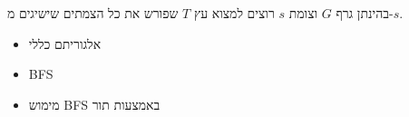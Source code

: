 בהינתן גרף $G$ וצומת $s$ רוצים למצוא עץ $T$ שפורש את כל הצמתים שישיגים מ-$s$.
\begin{itemize}
\item
אלגוריתם כללי
\item
BFS
\item
מימוש BFS באמצעות תור
\end{itemize}
